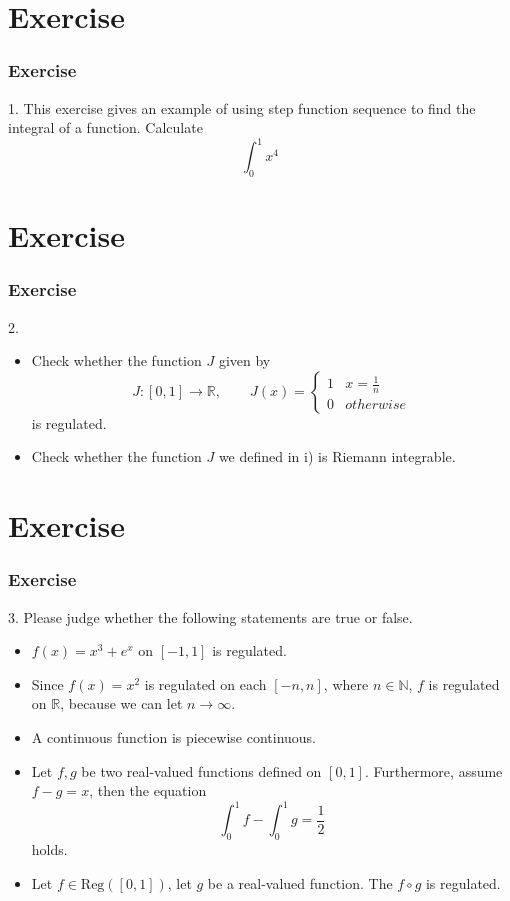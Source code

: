 \documentclass[12pt, t]{beamer}
\begin{document}
\section{Exercise}
\begin{frame}
    \frametitle{Exercise}
    1. This exercise gives an example of using step function sequence to find the integral of a function. Calculate
    \begin{equation*}
        \int_0^1x^4
    \end{equation*}
\end{frame}

\section{Exercise}
\begin{frame}
    \frametitle{Exercise}
    2.
    \begin{itemize}
        \item Check whether the function $J$ given by
              \begin{equation*}
                  J:[0,1]\rightarrow\mathbb{R}, \qquad J(x)=
                  \begin{cases}
                      1 & x=\frac{1}{n} \\
                      0 & otherwise
                  \end{cases}
              \end{equation*}
              is regulated.\\
              \vspace{1em}
        \item Check whether the function $J$ we defined in i) is Riemann integrable.
    \end{itemize}
\end{frame}

\section{Exercise}
\begin{frame}
    \frametitle{Exercise}
    3. Please judge whether the following statements are true or false.
    \begin{itemize}
        \item $f(x)=x^3+e^x$ on $[-1,1]$ is regulated.
        \item Since $f(x)=x^2$ is regulated on each $[-n,n]$, where $n\in\mathbb{N}$, $f$ is regulated on $\mathbb{R}$, because we can let $n\rightarrow\infty$.
        \item A continuous function is piecewise continuous.
        \item Let $f,g$ be two real-valued functions defined on $[0,1]$. Furthermore, assume $f-g=x$, then the equation \begin{equation*}
                  \int_0^1f-\int_0^1g=\frac{1}{2}
              \end{equation*} holds.
        \item Let $f\in\text{Reg}([0,1])$, let $g$ be a real-valued function. The $f\circ g$ is regulated.
    \end{itemize}
\end{frame}
\end{document}
